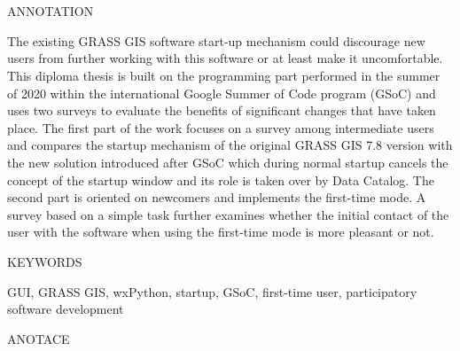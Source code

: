 \documentclass[a4paper,10pt,twoside]{article}
\begin{document}

\newpage ~ \newpage
\thispagestyle{empty}

\begin{figure}
 \centering 
 
\end{figure}


\newpage ~ \newpage
\newpage ~ \newpage
\thispagestyle{empty}


\renewcommand{\baselinestretch}{1.30} %


\begin{Large}
\noindent ANNOTATION
\end{Large}

\large
\noindent
The existing GRASS GIS software start-up mechanism could discourage new users from further working with this software or at least make it uncomfortable. This diploma thesis is built on the programming part performed in the summer of 2020 within the international Google Summer of Code program (GSoC) and uses two surveys to evaluate the benefits of significant changes that have taken place. The first part of the work focuses on a survey among intermediate users and compares the startup mechanism of the original GRASS GIS 7.8 version with the new solution introduced after GSoC which during normal startup cancels the concept of the startup window and its role is taken over by Data Catalog. The second part is oriented on newcomers and implements the first-time mode. A survey based on a simple task further examines whether the initial contact of the user with the software when using the first-time mode is more pleasant or not.

\vspace{2ex}
\begin{Large}
\noindent KEYWORDS
\end{Large}

\large
\noindent
\textrm{GUI, GRASS GIS, wxPython, startup, GSoC, first-time user, participatory software development}

\mbox{}
\vfill

\begin{Large}
\noindent ANOTACE
\end{Large} 
\end{document}
